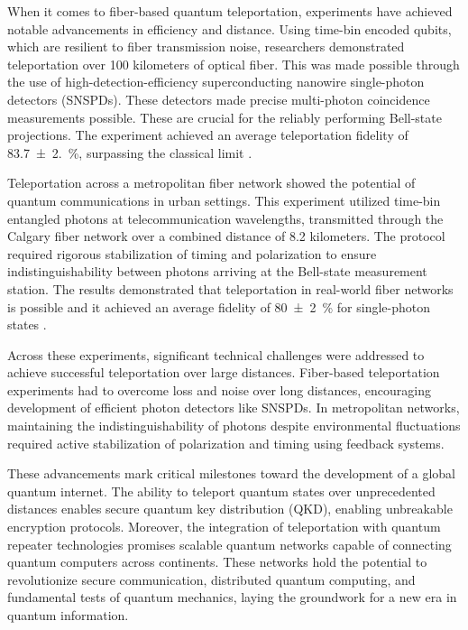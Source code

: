 When it comes to fiber-based quantum teleportation, experiments have achieved notable advancements in efficiency and distance. Using time-bin encoded qubits, which are resilient to fiber transmission noise, researchers demonstrated teleportation over 100 kilometers of optical fiber. This was made possible through the use of high-detection-efficiency superconducting nanowire single-photon detectors (SNSPDs). These detectors made precise multi-photon coincidence measurements possible. These are crucial for the reliably performing Bell-state projections. The experiment achieved an average teleportation fidelity of \SI{83.7(2.0)}{\percent}, surpassing the classical limit \cite{Takesue:2015}.

Teleportation across a metropolitan fiber network showed the potential of quantum communications in urban settings. This experiment utilized time-bin entangled photons at telecommunication wavelengths, transmitted through the Calgary fiber network over a combined distance of 8.2 kilometers. The protocol required rigorous stabilization of timing and polarization to ensure indistinguishability between photons arriving at the Bell-state measurement station. The results demonstrated that teleportation in real-world fiber networks is possible and it achieved an average fidelity of \SI{80(2)}{\percent} for single-photon states \cite{Valivarthi:2016}.

Across these experiments, significant technical challenges were addressed to achieve successful teleportation over large distances. Fiber-based teleportation experiments had to overcome loss and noise over long distances, encouraging development of efficient photon detectors like SNSPDs. In metropolitan networks, maintaining the indistinguishability of photons despite environmental fluctuations required active stabilization of polarization and timing using feedback systems.\cite{Valivarthi:2016}

These advancements mark critical milestones toward the development of a global quantum internet. The ability to teleport quantum states over unprecedented distances enables secure quantum key distribution (QKD), enabling unbreakable encryption protocols. Moreover, the integration of teleportation with quantum repeater technologies promises scalable quantum networks capable of connecting quantum computers across continents. These networks hold the potential to revolutionize secure communication, distributed quantum computing, and fundamental tests of quantum mechanics, laying the groundwork for a new era in quantum information.\cite{Valivarthi:2016}

